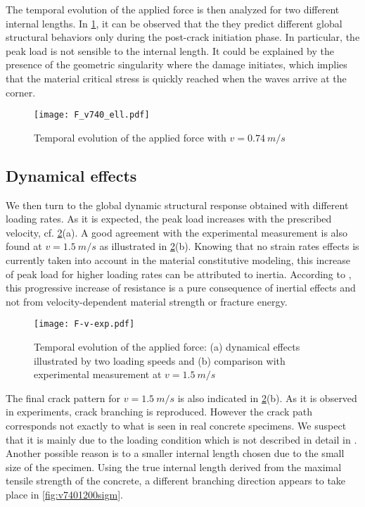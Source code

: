 The temporal evolution of the applied force is then analyzed for two different internal lengths. In \cref{fig:F_v740_ell}, it can be observed that the they predict different global structural behaviors only during the post-crack initiation phase. In particular, the peak load is not sensible to the internal length. It could be explained by the presence of the geometric singularity where the damage initiates, which implies that the material critical stress is quickly reached when the waves arrive at the corner.
\begin{figure}[htbp]
\centering
\texttt{[image: F\_v740\_ell.pdf]}
\caption{Temporal evolution of the applied force with $v=\SI{0.74}{m/s}$} \label{fig:F_v740_ell}
\end{figure}

\subsection{Dynamical effects}
We then turn to the global dynamic structural response obtained with different loading rates. As it is expected, the peak load increases with the prescribed velocity, cf. \cref{fig:F-v-exp}(a). A good agreement with the experimental measurement is also found at $v=\SI{1.5}{m/s}$ as illustrated in \cref{fig:F-v-exp}(b). Knowing that no strain rates effects is currently taken into account in the material constitutive modeling, this increase of peak load for higher loading rates can be attributed to inertia. According to \cite{OzboltBedeSharmaMayer:2015}, this progressive increase of resistance is a pure consequence of inertial effects and not from velocity-dependent material strength or fracture energy.
\begin{figure}[htbp]
\centering
\texttt{[image: F-v-exp.pdf]}
\caption{Temporal evolution of the applied force: (a) dynamical effects illustrated by two loading speeds and (b) comparison with experimental measurement at $v=\SI{1.5}{m/s}$} \label{fig:F-v-exp}
\end{figure}

The final crack pattern for $v=\SI{1.5}{m/s}$ is also indicated in \cref{fig:F-v-exp}(b). As it is observed in experiments, crack branching is reproduced. However the crack path corresponds not exactly to what is seen in real concrete specimens. We suspect that it is mainly due to the loading condition which is not described in detail in \cite{OzboltBedeSharmaMayer:2015}. Another possible reason is to a smaller internal length chosen due to the small size of the specimen. Using the true internal length derived from the maximal tensile strength of the concrete, a different branching direction appears to take place in \cref{fig:v7401200sigm}.

